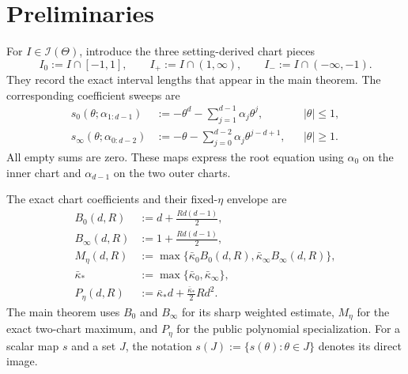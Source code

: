 \section{Preliminaries}
\label{sec:preliminaries}

For $I\in\mathcal I(\Theta)$, introduce the three setting-derived chart
pieces
\[
I_0:=I\cap[-1,1],\qquad
I_+:=I\cap(1,\infty),\qquad
I_-:=I\cap(-\infty,-1).
\]
They record the exact interval lengths that appear in the main theorem.  The
corresponding coefficient sweeps are
\[
\begin{aligned}
s_0(\theta;\alpha_{1:d-1})
&:=-\theta^d-\sum_{j=1}^{d-1}\alpha_j\theta^j,
&& |\theta|\leq1,\\
s_\infty(\theta;\alpha_{0:d-2})
&:=-\theta-\sum_{j=0}^{d-2}\alpha_j\theta^{j-d+1},
&& |\theta|\geq1.
\end{aligned}
\]
All empty sums are zero.  These maps express the root equation using
$\alpha_0$ on the inner chart and $\alpha_{d-1}$ on the two outer charts.

The exact chart coefficients and their fixed-$\eta$ envelope are
\[
\begin{aligned}
B_0(d,R)&:=d+\frac{Rd(d-1)}2,\\
B_\infty(d,R)&:=1+\frac{Rd(d-1)}2,\\
M_\eta(d,R)&:=\max\{\bar\kappa_0B_0(d,R),
                         \bar\kappa_\infty B_\infty(d,R)\},\\
\bar\kappa_*&:=\max\{\bar\kappa_0,\bar\kappa_\infty\},\\
P_\eta(d,R)&:=\bar\kappa_*d+\frac{\bar\kappa_*}{2}Rd^2.
\end{aligned}
\]
The main theorem uses $B_0$ and $B_\infty$ for its sharp weighted estimate,
$M_\eta$ for the exact two-chart maximum, and $P_\eta$ for the public
polynomial specialization.  For a scalar map $s$ and a set $J$, the notation
$s(J):=\{s(\theta):\theta\in J\}$ denotes its direct image.
